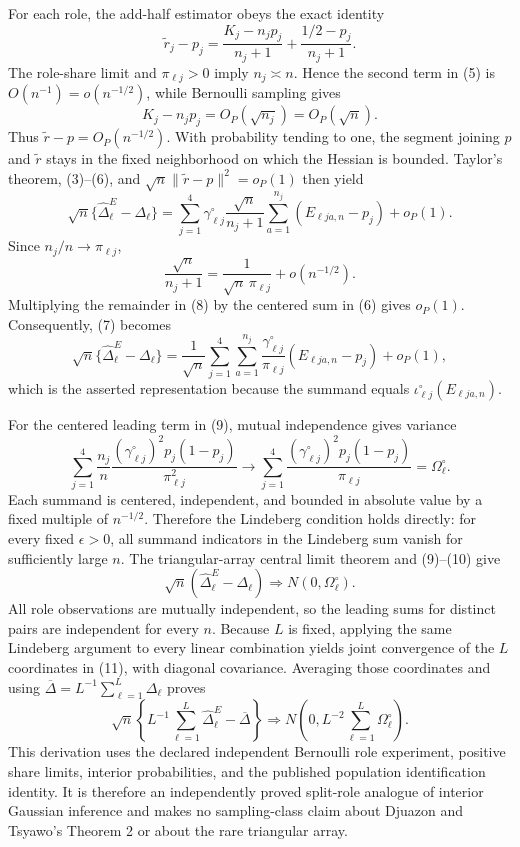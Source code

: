 For each role, the add-half estimator obeys the exact identity
\[
\widetilde r_j-p_j
=\frac{K_j-n_jp_j}{n_j+1}
+\frac{1/2-p_j}{n_j+1}.
\tag{5}
\]
The role-share limit and \(\pi_{\ell j}>0\) imply \(n_j\asymp n\).  Hence the second term in (5) is \(O(n^{-1})=o(n^{-1/2})\), while Bernoulli sampling gives
\[
K_j-n_jp_j=O_P(\sqrt{n_j})=O_P(\sqrt n).
\tag{6}
\]
Thus \(\widetilde r-p=O_P(n^{-1/2})\).  With probability tending to one, the segment joining \(p\) and \(\widetilde r\) stays in the fixed neighborhood on which the Hessian is bounded.  Taylor's theorem, (3)--(6), and \(\sqrt n\|\widetilde r-p\|^2=o_P(1)\) then yield
\[
\sqrt n\{\widehat\Delta^E_\ell-\Delta_\ell\}
=\sum_{j=1}^4\gamma^\circ_{\ell j}
\frac{\sqrt n}{n_j+1}
\sum_{a=1}^{n_j}(E_{\ell ja,n}-p_j)+o_P(1).
\tag{7}
\]
Since \(n_j/n\to\pi_{\ell j}\),
\[
\frac{\sqrt n}{n_j+1}
=\frac{1}{\sqrt n\,\pi_{\ell j}}+o(n^{-1/2}).
\tag{8}
\]
Multiplying the remainder in (8) by the centered sum in (6) gives \(o_P(1)\).  Consequently, (7) becomes
\[
\sqrt n\{\widehat\Delta^E_\ell-\Delta_\ell\}
=\frac1{\sqrt n}\sum_{j=1}^4\sum_{a=1}^{n_j}
\frac{\gamma^\circ_{\ell j}}{\pi_{\ell j}}
(E_{\ell ja,n}-p_j)+o_P(1),
\tag{9}
\]
which is the asserted representation because the summand equals \(\iota^\circ_{\ell j}(E_{\ell ja,n})\).

For the centered leading term in (9), mutual independence gives variance
\[
\sum_{j=1}^4\frac{n_j}{n}
\frac{(\gamma^\circ_{\ell j})^2p_j(1-p_j)}{\pi_{\ell j}^2}
\longrightarrow
\sum_{j=1}^4
\frac{(\gamma^\circ_{\ell j})^2p_j(1-p_j)}{\pi_{\ell j}}
=\Omega^\circ_\ell.
\tag{10}
\]
Each summand is centered, independent, and bounded in absolute value by a fixed multiple of \(n^{-1/2}\).  Therefore the Lindeberg condition holds directly: for every fixed \(\epsilon>0\), all summand indicators in the Lindeberg sum vanish for sufficiently large \(n\).  The triangular-array central limit theorem and (9)--(10) give
\[
\sqrt n(\widehat\Delta^E_\ell-\Delta_\ell)
\Rightarrow N(0,\Omega^\circ_\ell).
\tag{11}
\]
All role observations are mutually independent, so the leading sums for distinct pairs are independent for every \(n\).  Because \(L\) is fixed, applying the same Lindeberg argument to every linear combination yields joint convergence of the \(L\) coordinates in (11), with diagonal covariance.  Averaging those coordinates and using \(\overline\Delta=L^{-1}\sum_{\ell=1}^L\Delta_\ell\) proves
\[
\sqrt n\left\{L^{-1}\sum_{\ell=1}^{L}\widehat\Delta^E_\ell-\overline\Delta\right\}
\Rightarrow
N\!\left(0,L^{-2}\sum_{\ell=1}^{L}\Omega^\circ_\ell\right).
\]
This derivation uses the declared independent Bernoulli role experiment, positive share limits, interior probabilities, and the published population identification identity.  It is therefore an independently proved split-role analogue of interior Gaussian inference and makes no sampling-class claim about Djuazon and Tsyawo's Theorem 2 or about the rare triangular array.
